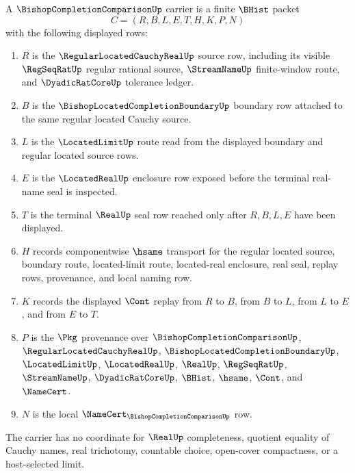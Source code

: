 \begin{definition}
\label{def:bishop-completion-comparison-carrier}
A $\BishopCompletionComparisonUp$ carrier is a finite $\BHist$ packet
$$
C=(R,B,L,E,T,H,K,P,N)
$$
with the following displayed rows:
\begin{enumerate}
\item $R$ is the $\RegularLocatedCauchyRealUp$ source row, including its visible $\RegSeqRatUp$ regular rational source, $\StreamNameUp$ finite-window route, and $\DyadicRatCoreUp$ tolerance ledger.
\item $B$ is the $\BishopLocatedCompletionBoundaryUp$ boundary row attached to the same regular located Cauchy source.
\item $L$ is the $\LocatedLimitUp$ route read from the displayed boundary and regular located source rows.
\item $E$ is the $\LocatedRealUp$ enclosure row exposed before the terminal real-name seal is inspected.
\item $T$ is the terminal $\RealUp$ seal row reached only after $R,B,L,E$ have been displayed.
\item $H$ records componentwise $\hsame$ transport for the regular located source, boundary route, located-limit route, located-real enclosure, real seal, replay rows, provenance, and local naming row.
\item $K$ records the displayed $\Cont$ replay from $R$ to $B$, from $B$ to $L$, from $L$ to $E$, and from $E$ to $T$.
\item $P$ is the $\Pkg$ provenance over $\BishopCompletionComparisonUp$, $\RegularLocatedCauchyRealUp$, $\BishopLocatedCompletionBoundaryUp$, $\LocatedLimitUp$, $\LocatedRealUp$, $\RealUp$, $\RegSeqRatUp$, $\StreamNameUp$, $\DyadicRatCoreUp$, $\BHist$, $\hsame$, $\Cont$, and $\NameCert$.
\item $N$ is the local $\NameCert_{\BishopCompletionComparisonUp}$ row.
\end{enumerate}
The carrier has no coordinate for $\RealUp$ completeness, quotient equality of Cauchy names, real trichotomy, countable choice, open-cover compactness, or a host-selected limit.
\end{definition}

